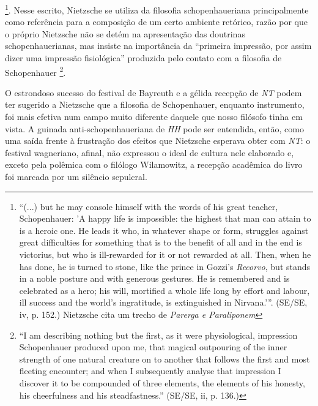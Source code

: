 \documentclass[
	12pt,				%
	openright,			%
	oneside,			%
	a4paper,			%
	english,			%
	french,				%
	spanish,			%
	brazil				%
	]{abntex2}
\begin{document}
\footnote{“(...) but he may console himself with the words of his great teacher, Schopenhauer: 'A happy life is impossible: the highest that man can attain to is a heroic one. He leads it who, in whatever shape or form, struggles against great difficulties for something that is to the benefit of all and in the end is victorius, but who is ill-rewarded for it or not rewarded at all. Then, when he has done, he is turned to stone, like the prince in Gozzi's \textit{Recorvo}, but stands in a noble posture and with generous gestures. He is remembered and is celebrated as a hero; his will, mortified a whole life long by effort and labour, ill success and the world's ingratitude, is extinguished in Nirvana.'”. (SE/SE, iv, p. 152.)  Nietzsche cita um trecho de \textit{Parerga e Paraliponem}}. 
Nesse escrito, Nietzsche se utiliza da filosofia schopenhaueriana principalmente como referência para a composição de um certo ambiente retórico, razão por que o próprio Nietzsche não se detém na apresentação das doutrinas schopenhauerianas, mas insiste na importância da “primeira impressão, por assim dizer uma impressão fisiológica” produzida pelo contato com a filosofia de Schopenhauer
\footnote{“I am describing nothing but the first, as it were physiological, impression Schopenhauer produced upon me, that magical outpouring of the inner strength of one natural creature on to another that follows the first and most fleeting encounter; and when I subsequently analyse that impression I discover it to be compounded of three elements, the elements of his honesty, his cheerfulness and his steadfastness.” (SE/SE, ii, p. 136.)}.

	O estrondoso sucesso do festival de Bayreuth e a gélida recepção de \textit{NT} podem ter sugerido a Nietzsche que a filosofia de Schopenhauer, enquanto instrumento, foi mais efetiva num campo muito diferente daquele que nosso filósofo tinha em vista. A guinada anti-schopenhaueriana de \textit{HH} pode ser entendida, então, como uma saída frente à frustração dos efeitos que Nietzsche esperava obter com \textit{NT}: o festival wagneriano, afinal, não expressou o ideal de cultura nele elaborado e, exceto pela polêmica com o filólogo Wilamowitz, a recepção acadêmica do livro foi marcada por um silêncio sepulcral. 
\end{document}
